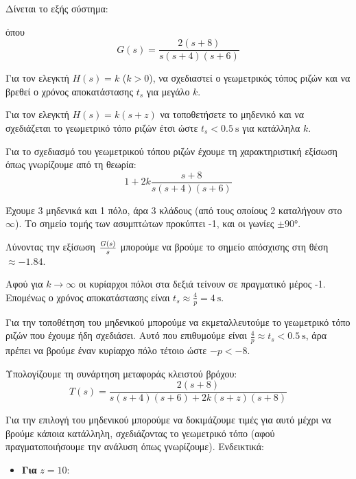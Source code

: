 \documentclass[11pt,a4paper,notitlepage,fleqn]{article}
\begin{document}
\begin{exercise}
Δίνεται το εξής σύστημα:

όπου \[
G(s) = \frac{2(s+8)}{s(s+4)(s+6)}
\]

\begin{enumgreekparen}
	\item Για τον ελεγκτή \( H(s) = k \) (\( k>0 \)), να σχεδιαστεί ο γεωμετρικός τόπος
	ριζών και να βρεθεί ο χρόνος αποκατάστασης \( t_s \) για μεγάλο \( k \).
	\item Για τον ελεγκτή \( H(s) = k(s+z) \) να τοποθετήσετε το μηδενικό και να σχεδιάζεται
	το γεωμετρικό τόπο ριζών έτσι ώστε \( t_s < \SI{0.5}{\second} \) για κατάλληλα \( k \).
\end{enumgreekparen}

\tcblower
\begin{enumgreekparen}
	\item Για το σχεδιασμό του γεωμετρικού τόπου ριζών έχουμε τη χαρακτηριστική εξίσωση
	όπως γνωρίζουμε από τη θεωρία:
	\[
	1+2k\frac{s+8}{s(s+4)(s+6)}
	\]
	
	
	Έχουμε 3 μηδενικά και 1 πόλο, άρα 3 κλάδους (από τους οποίους 2 καταλήγουν στο \( \infty \)). Το σημείο τομής των ασυμπτώτων προκύπτει -1, και οι γωνίες \( \pm \ang{90} \).
	
	Λύνοντας την εξίσωση \( \frac{G(s)}{s} \) μπορούμε να βρούμε το σημείο απόσχισης στη
	θέση \( \approx -1.84 \).
	
	
	Αφού για \( k\to \infty \) οι κυρίαρχοι πόλοι στα δεξιά τείνουν σε πραγματικό μέρος
	-1. Επομένως ο χρόνος αποκατάστασης είναι \( t_s \approx\frac{4}{p}=\SI{4}{\second} \).
	
	\item Για την τοποθέτηση του μηδενικού μπορούμε να εκμεταλλευτούμε το γεωμετρικό τόπο
	ριζών που έχουμε ήδη σχεδιάσει. Αυτό που επιθυμούμε είναι \( \frac{4}{p} \approx t_s <
	 \SI{0.5}{\second} \), άρα πρέπει να βρούμε έναν κυρίαρχο πόλο τέτοιο ώστε \( -p < -8 \).
	 
	Υπολογίζουμε τη συνάρτηση μεταφοράς κλειστού βρόχου:
	\[
	T(s) = \frac{2(s+8)}{s(s+4)(s+6)+2k(s+z)(s+8)}
	\]
	 
    Για την επιλογή του μηδενικού μπορούμε να δοκιμάζουμε τιμές για αυτό μέχρι να βρούμε
    κάποια κατάλληλη, σχεδιάζοντας το γεωμετρικό τόπο
    (αφού πραγματοποιήσουμε την ανάλυση όπως γνωρίζουμε). Ενδεικτικά:
    \begin{itemize}
    	\item \textbf{Για} \( z=10 \):
    	

\end{itemize}
\end{enumgreekparen}
\end{exercise}
\end{document}
